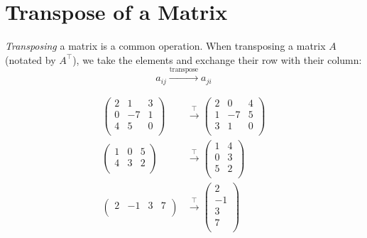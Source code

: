 \section{Transpose of a Matrix}
\emph{Transposing} a matrix is a common operation. When transposing a matrix $A$ (notated by $A^{\top}$), we take the elements and exchange their row with their column:
\begin{equation*}
  a_{ij} \overset{\text{transpose}}{\longrightarrow} a_{ji}
\end{equation*}

\begin{example}
  
  \begin{align*}
	\begin{pmatrix}
	  2 & 1 & 3\\
	  0 & -7 & 1\\
	  4 & 5 & 0\\
	\end{pmatrix}&\overset{\top}{\longrightarrow}
	\begin{pmatrix}
	  2 & 0 & 4\\
	  1 & -7 & 5\\
	  3 & 1 & 0\\
	\end{pmatrix}\\[5mm]
	\begin{pmatrix}
	  1 & 0 & 5\\
	  4 & 3 & 2\\
	\end{pmatrix}&\overset{\top}{\longrightarrow}
	\begin{pmatrix}
	  1 & 4\\
	  0 & 3\\
	  5 & 2\\
	\end{pmatrix}\\[5mm]
	\begin{pmatrix}
	  2 & -1 & 3 & 7\\
	\end{pmatrix}&\overset{\top}{\longrightarrow}
	\begin{pmatrix}
	  2\\
	  -1\\
	  3\\
	  7\\
	\end{pmatrix}
  \end{align*}
\end{example}

